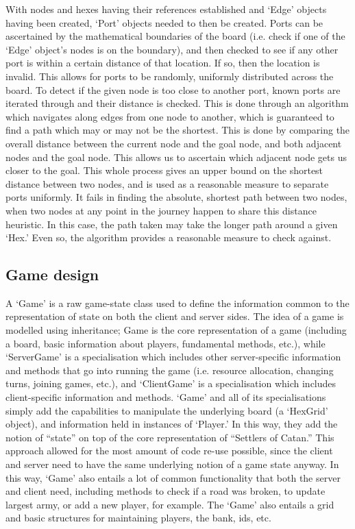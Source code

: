 \documentclass[a4paper,doc,draftfirst]{apa6}
\begin{document}
With nodes and hexes having their references established and ‘Edge’ objects having been created, ‘Port’ objects needed to then be created. Ports can be ascertained by the mathematical boundaries of the board (i.e. check if one of the ‘Edge’ object’s nodes is on the boundary), and then checked to see if any other port is within a certain distance of that location. If so, then the location is invalid. This allows for ports to be randomly, uniformly distributed across the board. To detect if the given node is too close to another port, known ports are iterated through and their distance is checked. This is done through an algorithm which navigates along edges from one node to another, which is guaranteed to find a path which may or may not be the shortest. This is done by comparing the overall distance between the current node and the goal node, and both adjacent nodes and the goal node. This allows us to ascertain which adjacent node gets us closer to the goal. This whole process gives an upper bound on the shortest distance between two nodes, and is used as a reasonable measure to separate ports uniformly. It fails in finding the absolute, shortest path between two nodes, when two nodes at any point in the journey happen to share this distance heuristic. In this case, the path taken may take the longer path around a given ‘Hex.’ Even so, the algorithm provides a reasonable measure to check against.

\subsection{Game design}
A ‘Game’ is a raw game-state class used to define the information common to the representation of state on both the client and server sides. The idea of a game is modelled using inheritance; Game is the core representation of a game (including a board, basic information about players, fundamental methods, etc.), while ‘ServerGame’ is a specialisation which includes other server-specific information and methods that go into running the game (i.e. resource allocation, changing turns, joining games, etc.), and ‘ClientGame’ is a specialisation which includes client-specific information and methods. ‘Game’ and all of its specialisations simply add the capabilities to manipulate the underlying board (a ‘HexGrid’ object), and information held in instances of ‘Player.’ In this way, they add the notion of “state” on top of the core representation of “Settlers of Catan.” This approach allowed for the most amount of code re-use possible, since the client and server need to have the same underlying notion of a game state anyway. In this way, ‘Game’ also entails a lot of common functionality that both the server and client need, including methods to check if a road was broken, to update largest army, or add a new player, for example. The ‘Game’ also entails a grid and basic structures for maintaining players, the bank, ids, etc.
\end{document}
